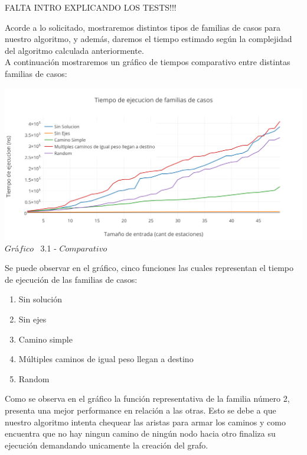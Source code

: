 FALTA INTRO EXPLICANDO LOS TESTS!!!

\indent Acorde a lo solicitado, mostraremos distintos tipos de familias de casos para nuestro algoritmo, y adem\'as, daremos el tiempo estimado 
seg\'un la complejidad del algoritmo calculada anteriormente.\\

A continuaci\'on mostraremos un gr\'afico de tiempos comparativo entre distintas familias de casos:\\ 

\vspace*{0.3cm} \vspace*{0.3cm}
  \begin{center}
 \includegraphics[scale=0.65]{./EJ3/comparativo.png}
 {$Gr$\'a$fico$ \ 3.1 - $Comparativo$}
  \end{center}
  \vspace*{0.3cm}
  
Se puede observar en el gr\'afico, cinco funciones las cuales representan el tiempo de ejecuci\'on de las familias de casos:\\
\begin{enumerate}
\item Sin solución
\item Sin ejes
\item Camino simple
\item Múltiples caminos de igual peso llegan a destino
\item Random
\end{enumerate}

Como se observa en el gr\'afico la funci\'on representativa de la familia n\'umero 2, presenta una mejor performance en relaci\'on a las otras. Esto se debe a que nuestro algoritmo intenta chequear las aristas para armar los caminos y como encuentra que no hay ningun camino de ningún nodo hacia otro finaliza su ejecuci\'on demandando unicamente la creaci\'on del grafo.

